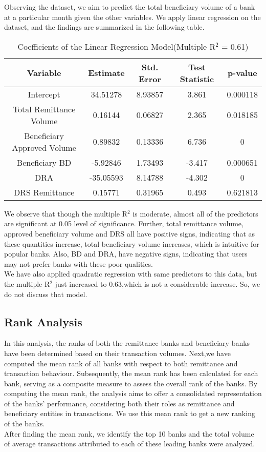 \documentclass{article}
\begin{document}
Observing the dataset, we aim to predict the total beneficiary volume of a bank at a particular month given the other variables. We apply linear regression on the dataset, and the findings are summarized in the following table.

\begin{table}[htbp]
\centering
\caption{Coefficients of the Linear Regression Model(Multiple R$^{2}$ = 0.61)}
\begin{tabular}{|c|c|c|c|c|}
\hline
\textbf{Variable} & \textbf{Estimate} & \textbf{Std. Error} & \textbf{Test Statistic} & \textbf{p-value} \\
\hline
Intercept & 34.51278 & 8.93857 & 3.861 & 0.000118 \\
Total Remittance Volume & 0.16144 & 0.06827 & 2.365 & 0.018185 \\
Beneficiary Approved Volume& 0.89832 & 0.13336 & 6.736 & 0 \\
Beneficiary BD & -5.92846 & 1.73493 & -3.417 & 0.000651 \\
DRA & -35.05593 & 8.14788 & -4.302 & 0 \\
DRS Remittance & 0.15771 & 0.31965 & 0.493 & 0.621813 \\
\hline
\end{tabular}
\end{table}

We observe that though the multiple R$^{2}$ is moderate, almost all of the predictors are significant at 0.05 level of significance.  Further, total remittance volume, approved beneficiary volume and DRS all have
positive signs, indicating that as these quantities increase, total beneficiary volume increases, which is intuitive for popular banks. Also, BD and DRA, have negative signs, indicating that users may not prefer banks with these poor qualities. \\
We have also applied quadratic regression with same predictors to this data, but the multiple R$^{2}$ just increased to 0.63,which is not a considerable increase. So, we do not discuss that model.


\subsection{Rank Analysis}

In this analysis, the ranks of both the remittance banks and beneficiary banks have been determined based on their transaction volumes. Next,we have computed the mean rank of all banks with respect to both remittance and transaction behaviour. Subsequently, the mean rank has been calculated for each bank, serving as a composite measure to assess the overall rank of the banks. By computing the mean rank, the analysis aims to offer a consolidated representation of the banks' performance, considering both their roles as remittance and beneficiary entities in transactions. We use this mean rank to get a new ranking of the banks.\\
After finding the mean rank, we identify the top 10 banks and the total volume of average transactions attributed to each of these leading banks were analyzed.\\
\end{document}
